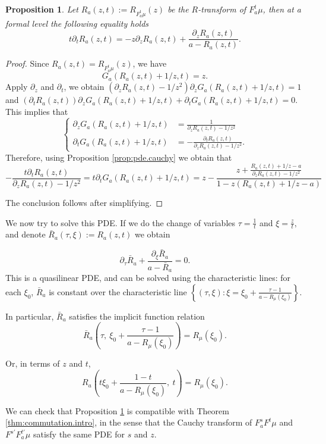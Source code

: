 \documentclass[reqno,11pt]{amsart}
\newtheorem{proposition}[theorem]{Proposition}
\theoremstyle{remark}
\newcommand{\freepower}[1]{F^{#1}}
\newcommand{\pfreepower}[2]{F_{#1}^{#2}}
\begin{document}
\begin{proposition}\label{prop:PDEforR}
     Let $ R_a(z,t):=R_{\pfreepower{a}{t}\mu}(z) $ be the $R$-transform of $ \pfreepower{a}{t}\mu $, then at a formal level the following equality holds
     $$  t\partial_t R_a(z,t) = -z\partial_z R_a(z,t) +\frac{ \partial_z R_a(z,t) }{ a-R_a(z,t) }.$$
\end{proposition}
\begin{proof}
    Since $R_a(z,t) = R_{\pfreepower{a}{t} \mu}(z) $, we have
$$ G_a( R_a(z,t)+1/z,t ) = z. $$
Apply $ \partial_z $ and $\partial_t$, we obtain
$ ( \partial_z R_a(z,t)-1/z^2 )\partial_z G_a(R_a(z,t)+1/z,t) = 1 $ and $ (\partial_t R_a(z,t))\partial_z G_a(R_a(z,t)+1/z,t) + \partial_t G_a(R_a(z,t)+1/z,t) = 0$. This implies that
$$\begin{cases}
    \partial_z G_a(R_a(z,t)+1/z,t) &= \frac{1}{\partial_z R_a(z,t)-1/z^2}\\
    \partial_t G_a(R_a(z,t)+1/z,t) &= -\frac{\partial_t R_a(z,t)}{\partial_z R_a(z,t)-1/z^2}.
\end{cases}$$
Therefore, using Proposition \ref{prop:pde.cauchy} we obtain that
$$-\frac{t\partial_t R_a(z,t)}{\partial_z R_a(z,t)-1/z^2}= t\partial_t G_a(R_a(z,t)+1/z,t)=z- \frac{z+ \frac{ R_a(z,t)+1/z-a} {\partial_z R_a(z,t)-1/z^2}}{ 1-z(R_a(z,t)+1/z-a) }$$

The conclusion follows after simplifying.
\end{proof}

We now try to solve this PDE. If we do the change of variables $ \tau =\tfrac{1}{t}$ and $\xi = \tfrac{z}{t},$ and denote $\bar{R}_a(\tau,\xi):=R_a(z,t)$ we obtain

$$ \partial_\tau \bar{R}_a + \frac{\partial_\xi \bar{R}_a}{a-\bar{R}_a} =0. $$
This is a quasilinear PDE, and can be solved using the characteristic lines: for each $ \xi_0 $, $\bar{R}_a$ is constant over the characteristic line $ \left\{ (\tau,\xi): \xi = \xi_0+ \frac{\tau -1 }{a-R_\mu( \xi_0 )} \right\} $.

In particular, $\bar{R}_a$ satisfies the implicit function relation
$$ \bar{R}_a\left( \tau ,\  \xi_0+ \frac{\tau -1 }{a-R_\mu( \xi_0 )}  \right) = R_\mu( \xi_0 ). $$

Or, in terms of $ z $ and $t$,
\begin{equation}
\label{eq.PDE}
R_a\left( t\xi_0+\frac{1 -t }{a-R_\mu( \xi_0 )} ,\ t \right) = R_\mu(\xi_0).     
\end{equation}

We can check that Proposition \ref{prop:PDEforR} is compatible with Theorem \ref{thm:commutation.intro}, in the sense that the Cauchy transform of $ \pfreepower{a}{s} \freepower{t}\mu$ 
and $\freepower{s'}\pfreepower{a}{t'}\mu $ satisfy the same PDE for $s$ and $z$.
\end{document}
